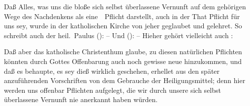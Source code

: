 \begin{aufza}
\item Daß Alles, was uns die bloße sich selbst überlassene Vernunft auf dem gehörigen Wege des Nachdenkens als eine~\ Pflicht darstellt, auch in der That Pflicht für uns sey, wurde in der katholischen Kirche von jeher geglaubet und gelehret. So schreibt auch der heil.\ Paulus ():  -- Und ():  -- Hieher gehört vielleicht auch : 
\item Daß aber das katholische Christenthum glaube, zu diesen natürlichen Pflichten könnten durch Gottes Offenbarung auch noch gewisse neue hinzukommen, und daß es behaupte, es sey dieß wirklich geschehen, erhellet aus den später anzuführenden Vorschriften von dem Gebrauche der Heiligungsmittel; denn hier werden uns offenbar Pflichten aufgelegt, die wir durch unsere sich selbst überlassene Vernunft nie anerkannt haben würden.
\end{aufza}

